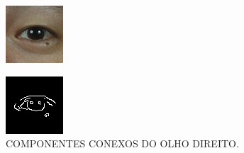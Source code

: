 \begin{figure}[h!]
    \caption{COMPONENTES CONEXOS DO OLHO DIREITO.}
    \centering
    \begin{minipage}[b]{0.32\textwidth}
        \centering
        \includegraphics[width=0.9\linewidth]{fig/02_detected_right_eye.png}
        \label{fig:olho}
    \end{minipage}
    \begin{minipage}[b]{0.32\textwidth}
        \centering
        \includegraphics[width=0.9\linewidth]{fig/03_right_eye_edge.png}

\end{minipage}
\end{figure}
